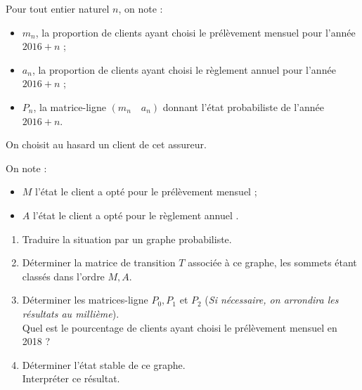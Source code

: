 \par
Pour tout entier naturel $n$, on note :
\begin{itemize}
     \item
     $m_{n}$, la proportion de clients ayant choisi le prélèvement mensuel pour l'année $2016 + n$ ;
     \item
     $a_{n}$, la proportion de clients ayant choisi le règlement annuel pour l'année $2016 + n$ ;
     \item
     $P_{n}$, la matrice-ligne $\left(m_{n} \quad a_{n}\right)$ donnant l'état probabiliste de l'année $2016 + n$.
\end{itemize}
\par
On choisit au hasard un client de cet assureur.
\par
On note :
\begin{itemize}
     \item %
     $M$ l'état \og le client a opté pour le prélèvement mensuel \fg{} ;
     \item %
     $A$ l'état \og le client a opté pour le règlement annuel \fg{} .
\end{itemize}
\par
%
%
\par
\begin{enumerate}
     \item %
     Traduire la situation par un graphe probabiliste.
     \item %
     Déterminer la matrice de transition $T$ associée à ce graphe, les sommets étant classés dans l'ordre $M, A$.
     \item %
     Déterminer les matrices-ligne $P_0, P_1$ et $P_2$ (\textit{Si nécessaire, on arrondira les résultats au millième}).\\
     Quel est le pourcentage de clients ayant choisi le prélèvement mensuel en 2018 ?
     \item %
     Déterminer l'état stable de ce graphe. \\
     Interpréter ce résultat.
     \par
\end{enumerate}
\par
